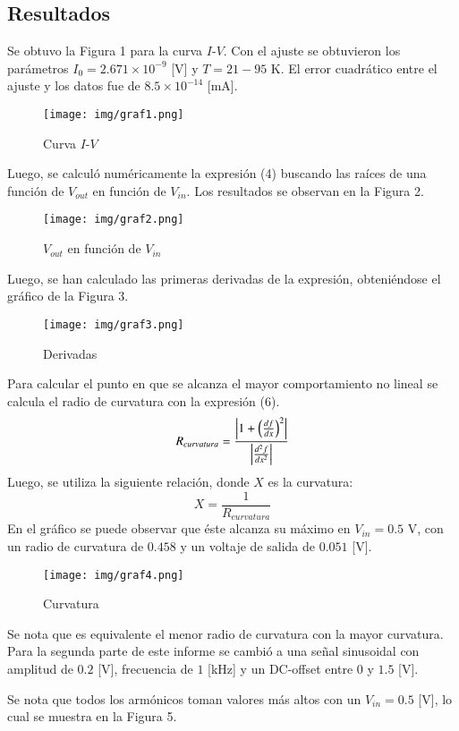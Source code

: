 \subsection{Resultados}
Se obtuvo la Figura 1 para la curva $I$-$V$. Con el ajuste se obtuvieron los parámetros $I_0=2.671\times 10^{-9}$ [V] y $T=21-95$ K. El error cuadrático entre el ajuste y los datos fue de $8.5\times 10^{-14}$ [mA].
\begin{figure}[H]
\centering
\texttt{[image: img/graf1.png]}
\caption{\label{fig:Grafico} Curva $I$-$V$}
\end{figure}
Luego, se calculó numéricamente la expresión (4) buscando las raíces de una función de $V_{out}$ en función de $V_{in}$. Los resultados se observan en la Figura 2.
\begin{figure}[H]
\centering
\texttt{[image: img/graf2.png]}
\caption{\label{fig:Grafico} $V_{out}$ en función de $V_{in}$}
\end{figure}
Luego, se han calculado las  primeras derivadas de la expresión, obteniéndose el gráfico de la Figura 3.
\begin{figure}[H]
\centering
\texttt{[image: img/graf3.png]}
\caption{\label{fig:Grafico} Derivadas}
\end{figure}
Para calcular el punto en que se alcanza el mayor comportamiento no lineal se calcula el radio de curvatura con la expresión (6).
\begin{equation}
    R_{curvatura}=\frac{\abs{1+\left(\frac{df}{dx}\right)^2}}{\abs{\frac{d^2f}{dx^2}}}
\end{equation}
Luego, se utiliza la siguiente relación, donde $X$ es la curvatura:
$$X=\frac{1}{R_{curvatura}}$$
En el gráfico se puede observar que éste alcanza su máximo en $V_{in}=0.5$ V, con un radio de curvatura de $0.458$ y un voltaje de salida de $0.051$ [V].
\begin{figure}[H]
\centering
\texttt{[image: img/graf4.png]}
\caption{\label{fig:Grafico} Curvatura}
\end{figure}
Se nota que es equivalente el menor radio de curvatura con la mayor curvatura.\\

Para la segunda parte de este informe se cambió a una señal sinusoidal con amplitud de $0.2$ [V], frecuencia de $1$ [kHz] y un DC-offset entre $0$ y $1.5$ [V].

Se nota que todos los armónicos toman valores más altos con un $V_{in}=0.5$ [V], lo cual se muestra en la Figura 5.

